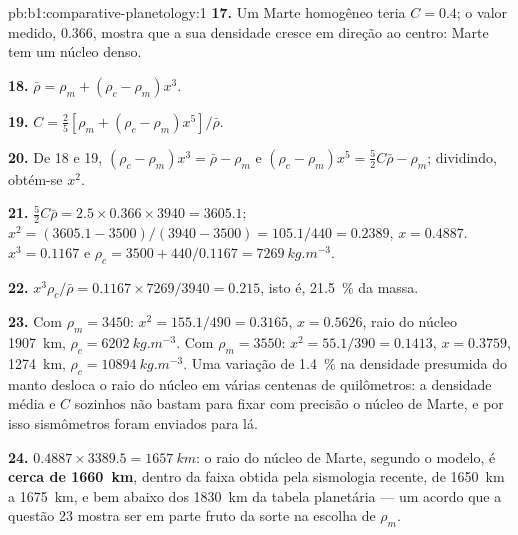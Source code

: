 \begin{solution}{pb:b1:comparative-planetology:1}
\textbf{17.} Um Marte homogêneo teria $C = 0.4$; o valor medido, 0.366, mostra
que a sua densidade cresce em direção ao centro: Marte tem um núcleo denso.

\textbf{18.} $\bar\rho = \rho_m + (\rho_c - \rho_m)x^3$.

\textbf{19.} $C = \tfrac25[\rho_m + (\rho_c - \rho_m)x^5]/\bar\rho$.

\textbf{20.} De 18 e 19, $(\rho_c - \rho_m)x^3 = \bar\rho - \rho_m$ e
$(\rho_c - \rho_m)x^5 = \tfrac52C\bar\rho - \rho_m$; dividindo, obtém-se $x^2$.

\textbf{21.} $\tfrac52C\bar\rho = 2.5\times0.366\times3940 = 3605.1$;
$x^2 = (3605.1 - 3500)/(3940 - 3500) = 105.1/440 = 0.2389$, $x = 0.4887$.
$x^3 = 0.1167$ e $\rho_c = 3500 + 440/0.1167 = \qty{7269}{kg.m^{-3}}$.

\textbf{22.} $x^3\rho_c/\bar\rho = 0.1167\times7269/3940 = 0.215$, isto é,
\qty{21.5}{\percent} da massa.

\textbf{23.} Com $\rho_m = 3450$: $x^2 = 155.1/490 = 0.3165$, $x = 0.5626$,
raio do núcleo \qty{1907}{km}, $\rho_c = \qty{6202}{kg.m^{-3}}$. Com $\rho_m =
3550$: $x^2 = 55.1/390 = 0.1413$, $x = 0.3759$, \qty{1274}{km},
$\rho_c = \qty{10894}{kg.m^{-3}}$. Uma variação de \qty{1.4}{\percent} na
densidade presumida do manto desloca o raio do núcleo em várias centenas de quilômetros:
a densidade média e $C$ sozinhos não bastam para fixar com precisão o núcleo de Marte, e por isso sismômetros foram enviados para lá.

\textbf{24.} $0.4887\times3389.5 = \qty{1657}{km}$: o raio do núcleo de Marte, segundo o modelo, é \textbf{cerca de \qty[text-series-to-math=true]{1660}{km}}, dentro da faixa obtida pela sismologia recente, de \qty{1650}{km} a \qty{1675}{km}, e bem abaixo dos \qty{1830}{km} da tabela planetária --- um acordo que a questão 23 mostra ser em parte fruto da sorte na escolha de $\rho_m$.
\end{solution}
